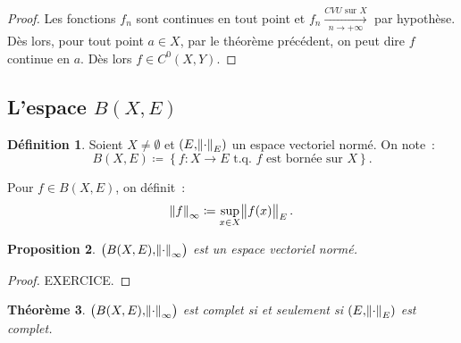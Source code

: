 \documentclass{report}
\newtheorem{thm}{Théorème}[chapter]
\newtheorem{prp}[thm]{Proposition}
\theoremstyle{definition}
\newtheorem{déf}[thm]{Définition}
\theoremstyle{remark}
\numberwithin{equation}{section}
\newcommand{\tq}{\text{ t.q. }}
\newcommand{\CONV}[5]{\xrightarrow[#2 \to #3]{#4 \text{ #5 } #1}}
\newcommand{\CVU}[3]{\CONV{#1}{#2}{#3}{CVU}{sur}}
\newcommand{\pinfty}{{+\infty}}
\newcommand{\evn}{espace vectoriel normé}
\begin{document}
			\begin{proof} Les fonctions $f_n$ sont continues en tout point et $f_n \CVU Xn\pinfty$ par hypothèse. Dès lors, pour tout point $a \in X$, par le
			théorème précédent, on peut dire $f$ continue en $a$. Dès lors $f \in C^0(X, Y)$.
			\end{proof}

		\subsection{L'espace $B(X, E)$}
			\begin{déf} Soient $X \neq \emptyset$ et $(E, \norm \cdot_E)$ un \evn. On note~:
			\begin{equation}
				B(X, E) \coloneqq \left\{f : X \to E \tq f \text{ est bornée sur } X\right\}.
			\end{equation}

			Pour $f \in B(X, E)$, on définit~:
			\begin{equation}
				\norm f_\infty \coloneqq \sup_{x \in X}\norm {f(x)}_E.
			\end{equation}
			\end{déf}

			\begin{prp} $\left(B(X, E), \norm \cdot_\infty\right)$ est un \evn. \end{prp}

			\begin{proof} EXERCICE.
			\end{proof}

			\begin{thm}\label{thm:BXEcpltssiEcplt} $\left(B(X, E), \norm \cdot_\infty\right)$ est complet si et seulement si $(E, \norm \cdot_E)$ est complet.
			\end{thm}
\end{document}
